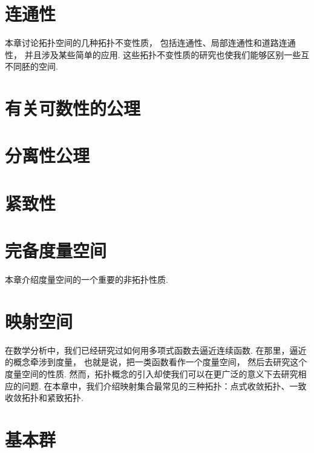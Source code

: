 \chapter{连通性}
本章讨论拓扑空间的几种拓扑不变性质，
包括连通性、局部连通性和道路连通性，
并且涉及某些简单的应用.
这些拓扑不变性质的研究也使我们能够区别一些互不同胚的空间.







\chapter{有关可数性的公理}




\chapter{分离性公理}







\chapter{紧致性}









\chapter{完备度量空间}
本章介绍度量空间的一个重要的非拓扑性质.




\chapter{映射空间}
在数学分析中，我们已经研究过如何用多项式函数去逼近连续函数.
在那里，逼近的概念牵涉到度量，
也就是说，把一类函数看作一个度量空间，
然后去研究这个度量空间的性质.
然而，拓扑概念的引入却使我们可以在更广泛的意义下去研究相应的问题.
在本章中，我们介绍映射集合最常见的三种拓扑：点式收敛拓扑、一致收敛拓扑和紧致拓扑.

\def\C{\mathscr{C}}  %
\def\wrho{\widetilde{\rho}}  %






\chapter{基本群}

\endgroup
